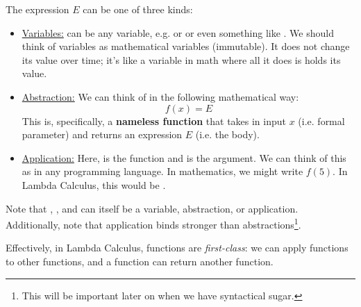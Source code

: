 \documentclass[letterpaper]{article}
\begin{document}
The expression $E$ can be one of three kinds: 
\begin{itemize}
    \item \underline{Variables:}  can be any variable, e.g.  or  or even something like . We should think of variables as mathematical variables (immutable). It does not change its value over time; it's like a variable in math where all it does is holds its value. 
    
    \item \underline{Abstraction:} We can think of  in the following mathematical way: 
    \[f(x) = E\]
    This is, specifically, a \textbf{nameless function} that takes in input $x$ (i.e. formal parameter) and returns an expression $E$ (i.e. the body).
    
    \item \underline{Application:} Here,  is the function and  is the argument. We can think of this as  in any programming language. In mathematics, we might write $f(5)$. In Lambda Calculus, this would be . 
\end{itemize}
Note that , , and  can itself be a variable, abstraction, or application. Additionally, note that application binds stronger than abstractions\footnote{This will be important later on when we have syntactical sugar.}. 

\bigskip 

Effectively, in Lambda Calculus, functions are \emph{first-class}: we can apply functions to other functions, and a function can return another function. 
\end{document}
